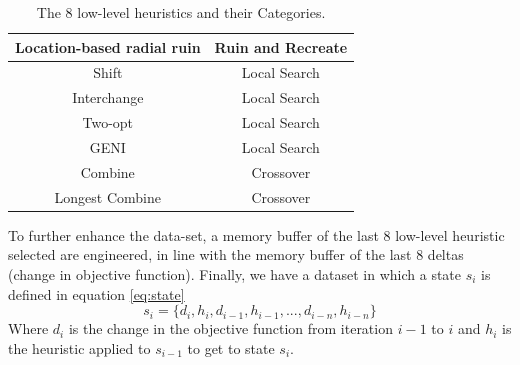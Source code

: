 \documentclass[a4paper,12pt]{article}
\begin{document}
{\begin{table}[ht]
\begin{tabular}{ | c | c | }
                            \hline 
                            Location-based radial ruin & Ruin and Recreate \\
                            \hline 
                            Shift & Local Search \\
                            \hline 
                            Interchange & Local Search\\
                            \hline 
                            Two-opt & Local Search \\
                            \hline 
                            GENI & Local Search \\
                            \hline
                            Combine & Crossover \\
                            \hline
                            Longest Combine & Crossover \\
                            \hline
                        \end{tabular}
                        \caption{The 8 low-level heuristics and their Categories.} 
                \end{table}
                To further enhance the data-set, a memory buffer of the last 8 low-level heuristic selected are engineered, in line with the memory buffer of 
                the last 8 deltas (change in objective function). \newline 
                \newline 
                Finally, we have a dataset in which a state $s_i$ is defined in equation \ref{eq:state}
                \begin{equation} \label{eq:state}
                     s_{i} = \{ d_{i}, h_{i}, d_{i-1},h_{i-1},...,d_{i-n},h_{i-n} \} 
                \end{equation} 
                Where $d_i$ is the change in the objective function from iteration $i-1$ to $i$ and $h_i$ is the heuristic applied to $s_{i-1}$ to get to state $s_i$.
            }
    \newpage
\end{document}
